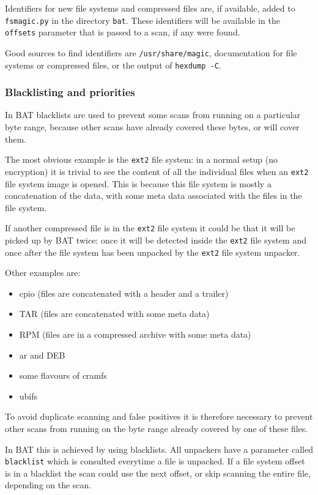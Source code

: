 \documentclass[10pt]{article}
\begin{document}
Identifiers for new file systems and compressed files are, if available, added
to \texttt{fsmagic.py} in the directory \texttt{bat}. These identifiers will be
available in the \texttt{offsets} parameter that is passed to a scan, if any
were found.

Good sources to find identifiers are \texttt{/usr/share/magic}, documentation
for file systems or compressed files, or the output of \texttt{hexdump -C}.

\subsubsection{Blacklisting and priorities}

In BAT blacklists are used to prevent some scans from running on a particular
byte range, because other scans have already covered these bytes, or will cover
them.

The most obvious example is the \texttt{ext2} file system: in a normal setup
(no encryption) it is trivial to see the content of all the individual files
when an \texttt{ext2} file system image is opened. This is because this file
system is mostly a concatenation of the data, with some meta data associated
with the files in the file system.

If another compressed file is in the \texttt{ext2} file system it could be that
it will be picked up by BAT twice: once it will be detected inside the
\texttt{ext2} file system and once after the file system has been unpacked by
the \texttt{ext2} file system unpacker.

Other examples are:

\begin{itemize}
\item cpio (files are concatenated with a header and a trailer)
\item TAR (files are concatenated with some meta data)
\item RPM (files are in a compressed archive with some meta data)
\item ar and DEB
\item some flavours of cramfs
\item ubifs
\end{itemize}

To avoid duplicate scanning and false positives it is therefore necessary to
prevent other scans from running on the byte range already covered by one of
these files.

In BAT this is achieved by using blacklists. All unpackers have a parameter
called \texttt{blacklist} which is consulted everytime a file is unpacked. If
a file system offset is in a blacklist the scan could use the next offset, or
skip scanning the entire file, depending on the scan.
\end{document}
